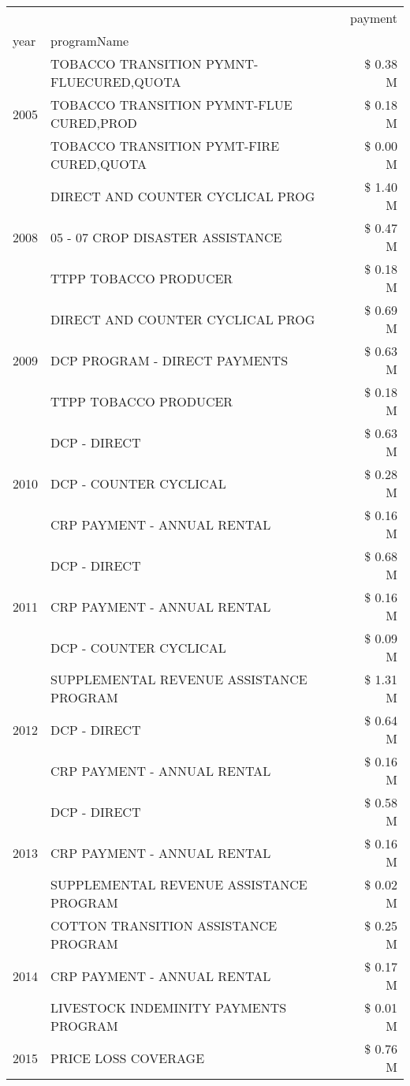 \begin{tabular}{llr}
\toprule
 &  & payment \\
year & programName &  \\
\midrule
\multirow[t]{3}{*}{2005} & TOBACCO TRANSITION PYMNT-FLUECURED,QUOTA & \$ 0.38 M \\
 & TOBACCO TRANSITION PYMNT-FLUE CURED,PROD & \$ 0.18 M \\
 & TOBACCO TRANSITION PYMT-FIRE CURED,QUOTA & \$ 0.00 M \\
\cline{1-3}
\multirow[t]{3}{*}{2008} & DIRECT AND COUNTER CYCLICAL PROG & \$ 1.40 M \\
 & 05 - 07 CROP DISASTER ASSISTANCE & \$ 0.47 M \\
 & TTPP TOBACCO PRODUCER & \$ 0.18 M \\
\cline{1-3}
\multirow[t]{3}{*}{2009} & DIRECT AND COUNTER CYCLICAL PROG & \$ 0.69 M \\
 & DCP PROGRAM - DIRECT PAYMENTS & \$ 0.63 M \\
 & TTPP TOBACCO PRODUCER & \$ 0.18 M \\
\cline{1-3}
\multirow[t]{3}{*}{2010} & DCP - DIRECT & \$ 0.63 M \\
 & DCP - COUNTER CYCLICAL & \$ 0.28 M \\
 & CRP PAYMENT - ANNUAL RENTAL & \$ 0.16 M \\
\cline{1-3}
\multirow[t]{3}{*}{2011} & DCP - DIRECT & \$ 0.68 M \\
 & CRP PAYMENT - ANNUAL RENTAL & \$ 0.16 M \\
 & DCP - COUNTER CYCLICAL & \$ 0.09 M \\
\cline{1-3}
\multirow[t]{3}{*}{2012} & SUPPLEMENTAL REVENUE ASSISTANCE PROGRAM & \$ 1.31 M \\
 & DCP - DIRECT & \$ 0.64 M \\
 & CRP PAYMENT - ANNUAL RENTAL & \$ 0.16 M \\
\cline{1-3}
\multirow[t]{3}{*}{2013} & DCP - DIRECT & \$ 0.58 M \\
 & CRP PAYMENT - ANNUAL RENTAL & \$ 0.16 M \\
 & SUPPLEMENTAL REVENUE ASSISTANCE PROGRAM & \$ 0.02 M \\
\cline{1-3}
\multirow[t]{3}{*}{2014} & COTTON TRANSITION ASSISTANCE PROGRAM & \$ 0.25 M \\
 & CRP PAYMENT - ANNUAL RENTAL & \$ 0.17 M \\
 & LIVESTOCK INDEMINITY PAYMENTS PROGRAM & \$ 0.01 M \\
\cline{1-3}
\multirow[t]{3}{*}{2015} & PRICE LOSS COVERAGE & \$ 0.76 M \\

\end{tabular}
